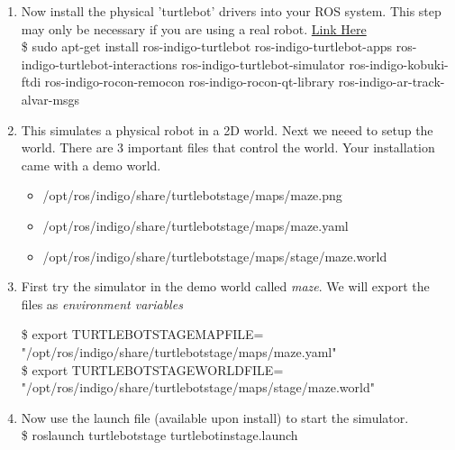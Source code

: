 \documentclass[12pt]{article}
\newcommand{\pthname}{/opt/ros/indigo/share/turtlebot\textunderscore stage/maps/}
\begin{document}
\begin{enumerate}
    \item Now install the physical 'turtlebot' drivers into your ROS system. This step may only be necessary if you are using a real robot. \href{http://wiki.ros.org/turtlebot/Tutorials/indigo/Turtlebot%20Installation} {Link Here} \\
    
    {\selectfont  \hspace{5mm} \$ sudo apt-get install ros-indigo-turtlebot ros-indigo-turtlebot-apps ros-indigo-turtlebot-interactions ros-indigo-turtlebot-simulator ros-indigo-kobuki-ftdi ros-indigo-rocon-remocon ros-indigo-rocon-qt-library ros-indigo-ar-track-alvar-msgs}
    
    \item This simulates a physical robot in a 2D world. Next we neeed to setup the world. There are 3 important files that control the world. Your installation came with a demo world.
    \begin{itemize}
    
        \item {\selectfont  \hspace{5mm} \pthname maze.png}
        \item {\selectfont  \hspace{5mm} \pthname maze.yaml}
        \item {\selectfont  \hspace{5mm} \pthname stage/maze.world}
    
    \end{itemize}

    \item First try the simulator in the demo world called {\it maze}. We will export the files as {\it environment variables}

    {\selectfont  \hspace{5mm} \$ export TURTLEBOT\textunderscore STAGE\textunderscore MAP\textunderscore FILE=\\"\pthname maze.yaml"}\\
 
    {\selectfont  \hspace{5mm} \$ export TURTLEBOT\textunderscore STAGE\textunderscore WORLD\textunderscore FILE=\\"\pthname stage/maze.world"}\\
    
    \item Now use the launch file (available upon install) to start the simulator.\\
    {\selectfont  \hspace{5mm} \$ roslaunch turtlebot\textunderscore stage turtlebot\textunderscore in\textunderscore stage.launch}
    

\end{enumerate}
\end{document}
